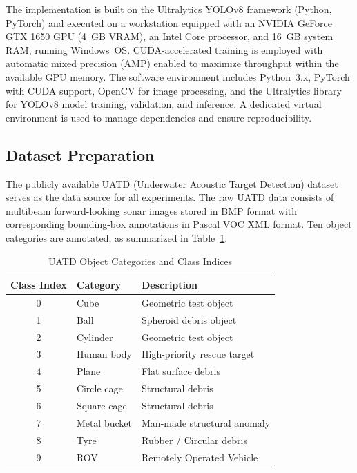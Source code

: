 \documentclass[conference]{IEEEtran}
\begin{document}
The implementation is built on the Ultralytics YOLOv8 framework (Python, PyTorch) and executed on a workstation equipped with an NVIDIA GeForce GTX 1650 GPU (4~GB VRAM), an Intel Core processor, and 16~GB system RAM, running Windows~OS. CUDA-accelerated training is employed with automatic mixed precision (AMP) enabled to maximize throughput within the available GPU memory. The software environment includes Python~3.x, PyTorch with CUDA support, OpenCV for image processing, and the Ultralytics library for YOLOv8 model training, validation, and inference. A dedicated virtual environment is used to manage dependencies and ensure reproducibility.

\subsection{Dataset Preparation}

The publicly available UATD (Underwater Acoustic Target Detection) dataset~\cite{ref10} serves as the data source for all experiments. The raw UATD data consists of multibeam forward-looking sonar images stored in BMP format with corresponding bounding-box annotations in Pascal VOC XML format. Ten object categories are annotated, as summarized in Table~\ref{tab:classes}.

\begin{table}[!t]
\caption{UATD Object Categories and Class Indices}
\label{tab:classes}
\centering
\begin{tabular}{@{}c l l@{}}
\toprule
\textbf{Class Index} & \textbf{Category} & \textbf{Description} \\
\midrule
0 & Cube          & Geometric test object \\
1 & Ball          & Spheroid debris object \\
2 & Cylinder      & Geometric test object \\
3 & Human body    & High-priority rescue target \\
4 & Plane         & Flat surface debris \\
5 & Circle cage   & Structural debris \\
6 & Square cage   & Structural debris \\
7 & Metal bucket  & Man-made structural anomaly \\
8 & Tyre          & Rubber / Circular debris \\
9 & ROV           & Remotely Operated Vehicle \\
\bottomrule
\end{tabular}
\end{table}
\end{document}
